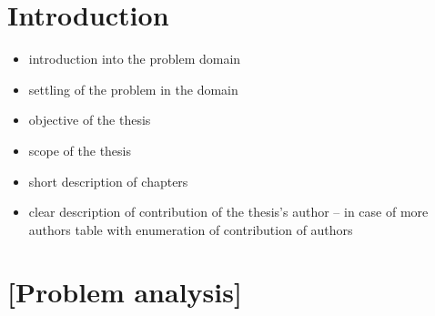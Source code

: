 \documentclass[a4paper,twoside,12pt]{book}
\begin{document}
\cleardoublepage

\pagestyle{PageNumbersChapterTitles}


\chapter{Introduction}

\begin{itemize}
	Recently, there has been significant progress in terms of Artificial Intelligence (later called AI) and Machine Learning (later called ML). Projects that in the past could barely recognize some simple objects or try to recognize some patterns are now surpassed by programs like advanced chat bots that can talk about literally anything or AI’s that can create very realistic art. Many famous personas like Elon Musk or Bill Gates start to recognize the potential of AI. 
	As this field is rapidly growing it appears to be both reasonable and demanded to perform research in this area.
	
\item introduction into the problem domain
\item settling of the problem in the domain
\item objective of the thesis 
\item scope of the thesis
\item short description of chapters
\item clear description of contribution of the thesis's author – in case of more authors table with enumeration of contribution of authors
\end{itemize}


\chapter{[Problem analysis]}
\end{document}
